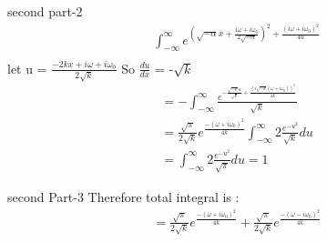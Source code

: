 \documentclass{beamer}
\begin{document}
\begin{frame}{second part-2}
   \begin{align}
    & \int_{-\infty}^{\infty}e^{(\sqrt{-\alpha}x + \frac{i\omega+i\omega_0}{2\sqrt{-\alpha}})^2 + \frac{(i\omega+i\omega_0)^2}{4\alpha}} & \\
\end{align}
let u = $\frac{-2kx+i\omega+i\omega_0}{2\sqrt{k}}$
So $\frac{du}{dx}$ = -$\sqrt{k}$
\begin{align}
    &= - \int_{-\infty}^{\infty} \frac{e^{-\frac{\sqrt{-k}u}{\sqrt{k}} + \frac{(i\sqrt{-k}(\omega+i\omega_0))^2}{4k}}}{\sqrt{k}} & \\
    & = \frac{\sqrt{\pi}}{2\sqrt{k}} e^{\frac{-(\omega+i\omega_0)^2}{4k}}\int_{-\infty}^{\infty}2\frac{e^{-u^2}}{\sqrt{k}}du & \\
      & = \int_{-\infty}^{\infty}2\frac{e^{-u^2}}{\sqrt{\pi}}du = 1& 
   \end{align} 
\end{frame}

\begin{frame}{second Part-3}
Therefore total integral is :
    \begin{align}
         & = \frac{\sqrt{\pi}}{2\sqrt{k}} e^{\frac{-(\omega+i\omega_0)^2}{4k}} + \frac{\sqrt{\pi}}{2\sqrt{k}} e^{\frac{-(\omega-i\omega_0)^2}{4k}}&
    \end{align}
\end{frame}
\end{document}
